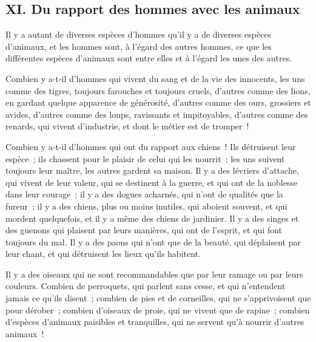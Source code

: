 \documentclass[french,twoside]{book} %
\begin{document}
\subsection[{XI. Du rapport des hommes avec les animaux}]{XI. Du rapport des hommes avec les animaux}
\noindent Il y a autant de diverses espèces d’hommes qu’il y a de diverses espèces d’animaux, et les hommes sont, à l’égard des autres hommes, ce que les différentes espèces d’animaux sont entre elles et à l’égard les unes des autres.\par
Combien y a-t-il d’hommes qui vivent du sang et de la vie des innocents, les uns comme des tigres, toujours farouches et toujours cruels, d’autres comme des lions, en gardant quelque apparence de générosité, d’autres comme des ours, grossiers et avides, d’autres comme des loups, ravissants et impitoyables, d’autres comme des renards, qui vivent d’industrie, et dont le métier est de tromper !\par
Combien y a-t-il d’hommes qui ont du rapport aux chiens ! Ils détruisent leur espèce ; ils chassent pour le plaisir de celui qui les nourrit ; les uns suivent toujours leur maître, les autres gardent sa maison. Il y a des lévriers d’attache, qui vivent de leur valeur, qui se destinent à la guerre, et qui ont de la noblesse dans leur courage ; il y a des dogues acharnés, qui n’ont de qualités que la fureur ; il y a des chiens, plus ou moins inutiles, qui aboient souvent, et qui mordent quelquefois, et il y a même des chiens de jardinier. Il y a des singes et des guenons qui plaisent par leurs manières, qui ont de l’esprit, et qui font toujours du mal. Il y a des paons qui n’ont que de la beauté, qui déplaisent par leur chant, et qui détruisent les lieux qu’ils habitent.\par
Il y a des oiseaux qui ne sont recommandables que par leur ramage ou par leurs couleurs. Combien de perroquets, qui parlent sans cesse, et qui n’entendent jamais ce qu’ils disent ; combien de pies et de corneilles, qui ne s’apprivoisent que pour dérober ; combien d’oiseaux de proie, qui ne vivent que de rapine ; combien d’espèces d’animaux paisibles et tranquilles, qui ne servent qu’à nourrir d’autres animaux !\par
\end{document}

